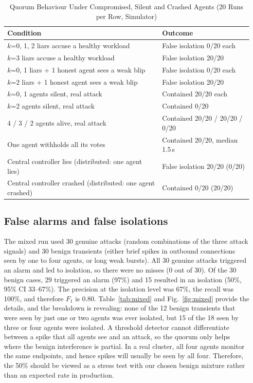 \documentclass[journal]{IEEEtran}
\begin{document}
\begin{table}[!t]
\caption{Quorum Behaviour Under Compromised, Silent and Crashed Agents (20 Runs per Row, Simulator)}
\label{tab:quorum}
\centering\footnotesize
\begin{tabularx}{\columnwidth}{@{}Y l@{}}
\toprule
Condition & Outcome \\
\midrule
$k$=0, 1, 2 liars accuse a healthy workload & False isolation 0/20 each \\
$k$=3 liars accuse a healthy workload & False isolation 20/20 \\
$k$=0, 1 liars + 1 honest agent sees a weak blip & False isolation 0/20 each \\
$k$=2 liars + 1 honest agent sees a weak blip & False isolation 20/20 \\
$k$=0, 1 agents silent, real attack & Contained 20/20 each \\
$k$=2 agents silent, real attack & Contained 0/20 \\
4 / 3 / 2 agents alive, real attack & Contained 20/20 / 20/20 / 0/20 \\
One agent withholds all its votes & Contained 20/20, median 1.5\,s \\
Central controller lies (distributed: one agent lies) & False isolation 20/20 (0/20) \\
Central controller crashed (distributed: one agent crashed) & Contained 0/20 (20/20) \\
\bottomrule
\end{tabularx}
\end{table}

\subsection{False alarms and false isolations}
The mixed run used 30 genuine attacks (random combinations of the three attack signals) and 30 benign transients (either brief spikes in outbound connections seen by one to four agents, or long weak bursts). All 30 genuine attacks triggered an alarm and led to isolation, so there were no misses (0 out of 30). Of the 30 benign cases, 29 triggered an alarm (97\%) and 15 resulted in an isolation (50\%, 95\% CI 33--67\%). The precision at the isolation level was 67\%, the recall was 100\%, and therefore $F_1$ is 0.80. Table~\ref{tab:mixed} and Fig.~\ref{fig:mixed} provide the details, and the breakdown is revealing: none of the 12 benign transients that were seen by just one or two agents was ever isolated, but 15 of the 18 seen by three or four agents were isolated. A threshold detector cannot differentiate between a spike that all agents see and an attack, so the quorum only helps where the benign interference is partial. In a real cluster, all four agents monitor the same endpoints, and hence spikes will usually be seen by all four. Therefore, the 50\% should be viewed as a stress test with our chosen benign mixture rather than an expected rate in production.
\end{document}
